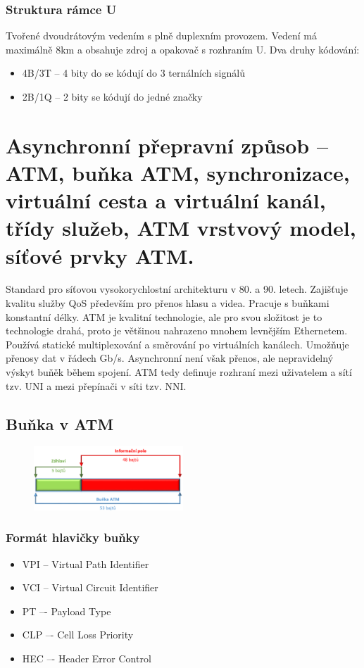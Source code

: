\subsubsection{Struktura rámce U}

Tvořené dvoudrátovým vedením s plně duplexním provozem. Vedení má maximálně 8km a obsahuje zdroj a opakovač s rozhraním U. Dva druhy kódování:
\begin{itemize}
    \item 4B/3T -- 4 bity do se kódují do 3 ternálních signálů
    \item 2B/1Q -- 2 bity se kódují do jedné značky
\end{itemize}


\clearpage
\section{Asynchronní přepravní způsob – ATM, buňka ATM, synchronizace, virtuální cesta a virtuální kanál, třídy služeb, ATM vrstvový model, síťové prvky ATM.}

Standard pro síťovou vysokorychlostní architekturu v 80. a 90. letech. Zajišťuje kvalitu služby QoS především pro přenos hlasu a videa. Pracuje s buňkami konstantní délky. ATM je kvalitní technologie, ale pro svou složitost je to technologie drahá, proto je většinou nahrazeno mnohem levnějším Ethernetem. Používá statické multiplexování a směrování po virtuálních kanálech. Umožňuje přenosy dat v řádech Gb/s. Asynchronní není však přenos, ale nepravidelný výskyt buňěk během spojení. ATM tedy definuje rozhraní mezi uživatelem a sítí tzv. UNI a mezi přepínači v síti tzv. NNI.

\subsection{Buňka v ATM}
\begin{figure} [h]
    \centering
    \includegraphics[width=0.5\textwidth]{snimky/ATM bunka.png}
    \label{fig:uml}
\end{figure}

\subsubsection{Formát hlavičky buňky}
\begin{itemize}
    \item VPI -- Virtual Path Identifier
    \item VCI -- Virtual Circuit Identifier
    \item PT –- Payload Type
    \item CLP –- Cell Loss Priority
    \item HEC –- Header Error Control
\end{itemize}

